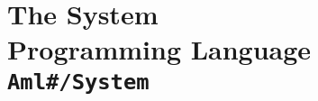 
\part[The Amlantis\# System Programming Language]{The \AmlSharpTitle System \\Programming Language \\ \vspace{1cm} \lstinline!Aml#/System!}
\label{part:language-sharp-system}
















